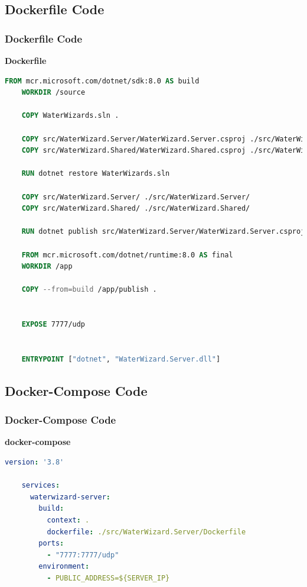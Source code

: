 \documentclass{beamer}
\begin{document}
\subsection{Dockerfile Code}
\begin{frame}[fragile]
\frametitle{Dockerfile Code}
  \textbf{Dockerfile}
  \begin{lstlisting}[language=Dockerfile,basicstyle=\ttfamily\tiny]
    FROM mcr.microsoft.com/dotnet/sdk:8.0 AS build
    WORKDIR /source

    COPY WaterWizards.sln .

    COPY src/WaterWizard.Server/WaterWizard.Server.csproj ./src/WaterWizard.Server/
    COPY src/WaterWizard.Shared/WaterWizard.Shared.csproj ./src/WaterWizard.Shared/

    RUN dotnet restore WaterWizards.sln

    COPY src/WaterWizard.Server/ ./src/WaterWizard.Server/
    COPY src/WaterWizard.Shared/ ./src/WaterWizard.Shared/

    RUN dotnet publish src/WaterWizard.Server/WaterWizard.Server.csproj -c Release -o /app/publish

    FROM mcr.microsoft.com/dotnet/runtime:8.0 AS final
    WORKDIR /app

    COPY --from=build /app/publish .


    EXPOSE 7777/udp


    ENTRYPOINT ["dotnet", "WaterWizard.Server.dll"]
  \end{lstlisting}
\end{frame}

\subsection{Docker-Compose Code}
\begin{frame}[fragile]
\frametitle{Docker-Compose Code}
  \textbf{docker-compose}
  \begin{lstlisting}[language=yaml,basicstyle=\ttfamily\tiny]
    version: '3.8'

    services:
      waterwizard-server:
        build:
          context: .
          dockerfile: ./src/WaterWizard.Server/Dockerfile
        ports:
          - "7777:7777/udp"
        environment:
          - PUBLIC_ADDRESS=${SERVER_IP}
  \end{lstlisting}
\end{frame}
\end{document}
